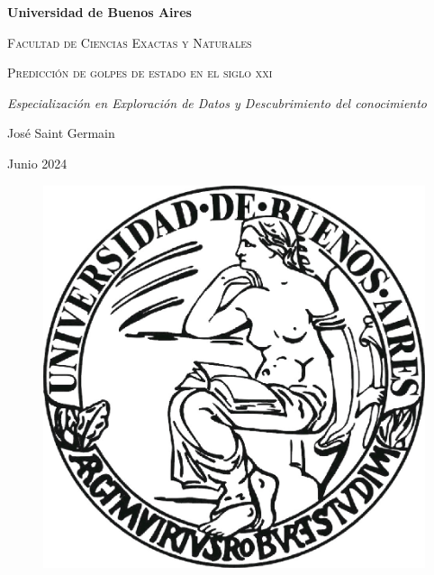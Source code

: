 \documentclass{article}
\begin{document}
\begin{titlepage}
  \centering
  {\bfseries\LARGE Universidad de Buenos Aires \par}
  \vspace{1cm}
  {\scshape\Large Facultad de Ciencias Exactas y Naturales \par}
  \vspace{2cm}
  {\scshape\Huge Predicción de golpes de estado en el siglo xxi \par}
  \vspace{2cm}
  {\itshape\Large Especializaci\'on en Exploraci\'on de Datos y Descubrimiento del conocimiento \par}
  \vfill
  {\Large José Saint Germain \par}
  \vfill
  {\Large Junio 2024 \par}

  \begin{figure}[H]
    \centering 
    \includegraphics[width=.4\textwidth]{0_portada.jpg}
   \end{figure}

   \renewcommand{\abstractname}{Resumen}
   \begin{abstract}
    \noindent
    Este trabajo se enfoca en replicar el trabajo de Cebotari et al (\citeyear{Ceb24}) 
    y del Fondo Monetario Internacional (FMI) con el objetivo de desarrollar modelos
    de aprendizaje automático predictores de golpes de estado en el siglo xxi,
    utilizando la base de datos construida por la fundación Varieties of Democracy 
    (\citeyear{Cop24}). Adicionalmente, indaga en el análisis de las predicciones con
    valores Shapley. Los dos modelos entrenados demostraron un alto nivel de predicción,
    si bien fallaron en predecir golpes de estado fallidos y no lograron superar la performance
    del artículo del FMI. Los valores Shapley destacaron
    la importancia de las fuerzas armadas como factor desestabilizador de gobiernos y del
    nivel educativo como disuasivo.
    
  \end{abstract}
\end{titlepage}
\end{document}
